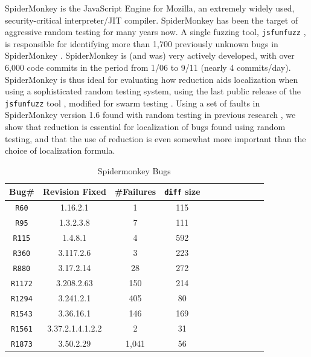 SpiderMonkey is the JavaScript Engine for Mozilla, an extremely widely
used, security-critical interpreter/JIT compiler.  SpiderMonkey has
been the target of aggressive random testing for many years now.  A
single fuzzing tool, \texttt{jsfunfuzz} \cite{jsfunfuzz}, is
responsible for identifying more than 1,700 previously unknown bugs in
SpiderMonkey \cite{jsfunfuzzbugs}.  SpiderMonkey is (and was) very
actively developed, with over 6,000 code commits in the period from
1/06 to 9/11 (nearly 4 commits/day).  SpiderMonkey is thus ideal for
evaluating how reduction aids localization when using a sophisticated
random testing system, using the last public release of the
\texttt{jsfunfuzz} tool \cite{jsfunfuzz}, modified for swarm testing \cite{ISSTA12}.
Using a set of faults in SpiderMonkey version 1.6 found with random
testing in previous research \cite{PLDI13}, we show that reduction is
essential for localization of bugs found using random testing, and
that the use of reduction is even somewhat more important than the
choice of localization formula.  


\begin{table}
\begin{center}
\begin{tabular}{|c||c|c|c|c|c||c|c|c|c|c|}
\hline
Bug\# & Revision Fixed &  \#Failures & {\tt diff} size \\
\hline
\hline
{\tt R60} & 1.16.2.1 & 1 & 115  \\
\hline
{\tt R95} & 1.3.2.3.8 & 7 & 111   \\
\hline
{\tt R115} & 1.4.8.1 & 4 & 592   \\
\hline
{\tt R360} & 3.117.2.6 & 3 & 223  \\
\hline
{\tt R880} & 3.17.2.14 & 28 & 272   \\ 
\hline
{\tt R1172} & 3.208.2.63 & 150 & 214  \\
\hline
{\tt R1294} & 3.241.2.1 & 405 & 80  \\
\hline
{\tt R1543} & 3.36.16.1 & 146 & 169  \\
\hline
{\tt R1561} & 3.37.2.1.4.1.2.2 & 2 & 31  \\
\hline
{\tt R1873} & 3.50.2.29 & 1,041 & 56  \\
\hline
\end{tabular}
\end{center}
\caption{Spidermonkey Bugs}
\label{tab:spiderbugs}
\end{table}


